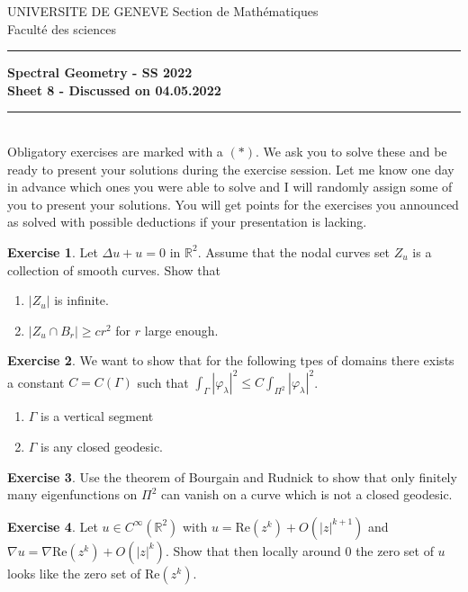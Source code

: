 \documentclass[a4paper,11pt]{article}
\theoremstyle{definition}
\newtheorem{exercise}{Exercise}
\begin{document}
\pagestyle{headings}
\noindent UNIVERSITE DE GENEVE \hfill Section de Mathématiques\\
\noindent Facult\'e des sciences \hfill \\[-3mm]
\hrule

\large

\begin{center}
\textbf{Spectral Geometry - SS 2022 \\ Sheet 8 - Discussed on 04.05.2022}
\end{center}
\hrule
\text{}\\[1cm]

Obligatory exercises are marked with a $(*)$. We ask you to solve these and be ready to present your solutions during the exercise session. Let me know one day in advance which ones you were able to solve and I will randomly assign some of you to present your solutions. You will get points for the exercises you announced as solved with possible deductions if your presentation is lacking.

\begin{exercise}
	Let $\Delta u + u = 0$ in $\mathbb{R}^2$. Assume that the nodal curves set $Z_u$ is a collection of smooth curves. Show that
	\begin{enumerate}
		\item $|Z_u|$ is infinite.
		\item $|Z_u \cap B_r| \geq c r^2$ for $r$ large enough.
	\end{enumerate}
\end{exercise}

\begin{exercise}
	We want to show that for the following tpes of domains there exists a constant $C = C(\Gamma)$ such that $\int_\Gamma |\varphi_\lambda|^2 \leq C \int_{\Pi^2} |\varphi_\lambda|^2$.
	\begin{enumerate}
		\item $\Gamma $ is a vertical segment
		\item $\Gamma$ is any closed geodesic.
	\end{enumerate}
\end{exercise}

\begin{exercise}
	Use the theorem of Bourgain and Rudnick to show that only finitely many eigenfunctions on $\Pi^2$ can vanish on a curve which is not a closed geodesic.
\end{exercise}

\begin{exercise}
	Let $u \in C^\infty(\mathbb{R}^2)$ with $u = \text{Re}(z^k) + O(|z|^{k+1})$ and $\nabla u = \nabla \text{Re}(z^k) + O(|z|^{k})$. Show that then locally around $0$ the zero set of $u$ looks like the zero set of $\text{Re}(z^k)$.
\end{exercise}
\end{document}
